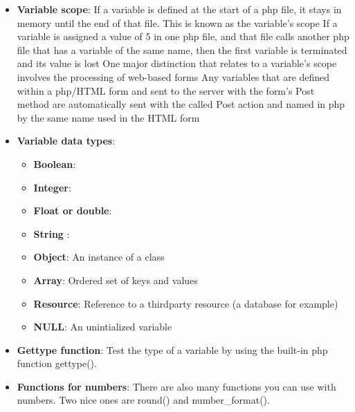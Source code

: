 \documentclass{report}
\begin{document}
\begin{itemize}
\begin{itemize}
            \end{itemize}
            \bigbreak \noindent 
        \item \textbf{Variable scope}:  If a variable is defined at the start of a php file, it stays in memory until the end of that file. This is known as the variable's scope
            \bigbreak \noindent 
            If a variable is assigned a value of 5 in one php file, and that file calls another php file that has a variable of the same name, then the first variable is terminated and its value is lost
            \bigbreak \noindent 
            One major distinction that relates to a variable's scope involves the processing of web-based forms
            \bigbreak \noindent 
            Any variables that are defined within a php/HTML form and sent to the server with the form's Post method are automatically sent with the called Post action and named in php by the same name used in the HTML form
        \item \textbf{Variable data types}: 
            \begin{itemize}
                \item \textbf{Boolean}: 
                \item \textbf{Integer}:
                \item \textbf{Float or double}:
                \item \textbf{String }:
                \item \textbf{Object}:  An instance of a class
                \item \textbf{Array}:  Ordered set of keys and values
                \item \textbf{Resource}: Reference to a thirdparty resource (a database for example)
                \item \textbf{NULL}: An unintialized variable
            \end{itemize}
        \item \textbf{Gettype function}: Test the type of a variable by using the built-in php function gettype().
        \item \textbf{Functions for numbers}: There are also many functions you can use with numbers. Two nice ones are round() and number\_format().

\end{itemize}
\end{document}

